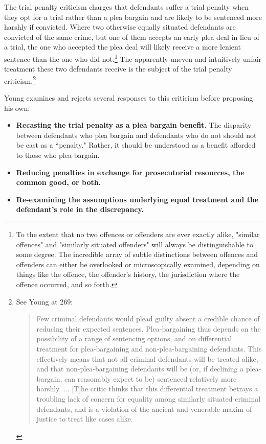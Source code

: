 The trial penalty criticism charges that defendants suffer a trial penalty when they opt for a trial rather than a plea bargain and are likely to be sentenced more harshly if convicted. Where two otherwise equally situated defendants are convicted of the same crime, but one of them accepts an early plea deal in lieu of a trial, the one who accepted the plea deal will likely receive a more lenient sentence than the one who did not.\footnote{To the extent that no two offences or offenders are ever exactly alike, "similar offences" and "similarly  situated offenders" will always be distinguishable to some degree. The incredible array of subtle distinctions between offences and offenders can either be overlooked or microscopically examined, depending on things like the offence, the offender's history, the jurisdiction where the offence occurred, and so forth.} The apparently uneven and intuitively unfair treatment these two defendants receive is the subject of the trial penalty criticism.\footnote{See Young at 269: 
\begin{quote}
    Few criminal defendants would plead guilty absent a credible chance of reducing their expected sentences. Plea-bargaining thus depends on the possibility of a range of sentencing options, and on differential treatment for plea-bargaining and non-plea-bargaining defendants. This effectively means that not all criminal defendants will be treated alike, and that non-plea-bargaining defendants will be (or, if declining a plea-bargain, can reasonably expect to be) sentenced relatively more harshly. ... [T]he critic thinks that this differential treatment betrays a troubling lack of concern for equality among similarly situated criminal defendants, and is a violation of the ancient and venerable maxim of justice to treat like cases alike.
\end{quote}}

Young examines and rejects several responses to this criticism before proposing his own:

\begin{itemize}
    \item \textbf{Recasting the trial penalty as a plea bargain benefit.} The disparity between defendants who plea bargain and defendants who do not should not be cast as a ``penalty." Rather, it should be understood as a benefit afforded to those who plea bargain.
    \item \textbf{Reducing penalties in exchange for prosecutorial resources, the common good, or both.} 
    \item \textbf{Re-examining the assumptions underlying equal treatment and the defendant's role in the discrepancy.} 
\end{itemize}

